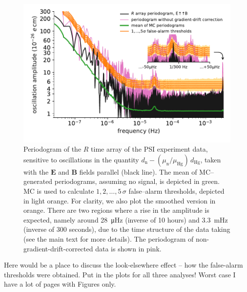 \begin{figure}
  \centering
  \includegraphics[width=\linewidth]{gfx/axions/detection_psi_inset_gc.pdf}
  \caption{Periodogram of the $R$ time array of the PSI experiment data, sensitive to oscillations in the quantity $d_\mathrm{n} - \left( \mu_\mathrm{n} / \mu_\mathrm{Hg} \right) \, d_\mathrm{Hg}$, taken with the $\boldsymbol{E}$ and $\boldsymbol{B}$ fields parallel (black line).
  The mean of MC--generated periodograms, assuming no signal, is depicted in green. MC is used to calculate $1,2,…,5\,\sigma$ false--alarm thresholds, depicted in light orange.
  For clarity, we also plot the smoothed version in orange.
  There are two regions where a rise in the amplitude is expected, namely around \SI{28}{\micro\hertz} (inverse of 10 hours) and \SI{3.3}{\milli\hertz} (inverse of 300 seconds), due to the time structure of the data taking (see the main text for more details). The periodogram of non-gradient-drift-corrected data is shown in pink.}
  \label{fig:axions_PSI_detection}
\end{figure}

Here would be a place to discuss the look-elsewhere effect -- how the false-alarm thresholds were obtained. Put in the plots for all three analyses! Worst case I have a lot of pages with Figures only.

